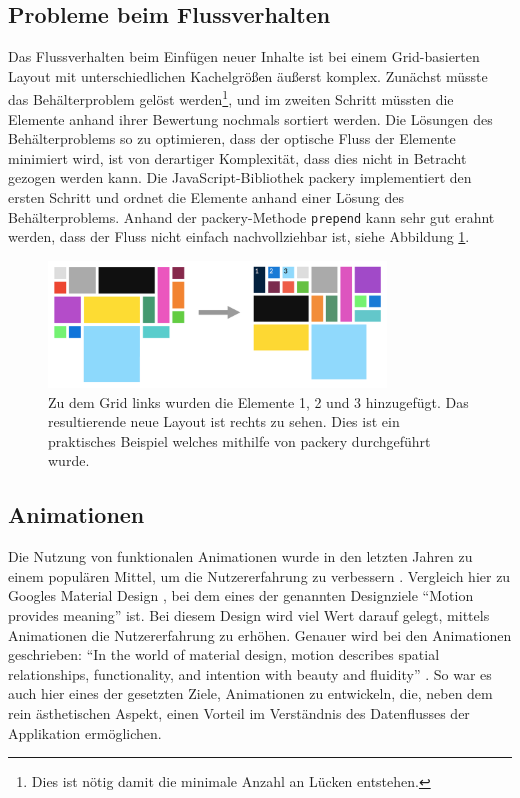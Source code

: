 \documentclass[12pt,twoside]{book}
\begin{document}
  \subsection{Probleme beim Flussverhalten}
  Das Flussverhalten beim Einfügen neuer Inhalte ist bei einem Grid-basierten Layout mit unterschiedlichen Kachelgrößen äußerst komplex. Zunächst müsste das Behälterproblem gelöst werden\footnote{Dies ist nötig damit die minimale Anzahl an Lücken entstehen.}, und im zweiten Schritt müssten die Elemente anhand ihrer Bewertung nochmals sortiert werden. Die Lösungen des Behälterproblems so zu optimieren, dass der optische Fluss der Elemente minimiert wird, ist von derartiger Komplexität, dass dies nicht in Betracht gezogen werden kann. Die JavaScript-Bibliothek packery \cite{packery} implementiert den ersten Schritt und ordnet die Elemente anhand einer Lösung des Behälterproblems. Anhand der packery-Methode \texttt{prepend} kann sehr gut erahnt werden, dass der Fluss nicht einfach nachvollziehbar ist, siehe Abbildung \ref{fig:grid_flow}.

  \begin{figure}[htbp]
    \centering
    \includegraphics[width=0.8\textwidth]{images/grid_flow.png}
    \caption{Zu dem Grid links wurden die Elemente 1, 2 und 3 hinzugefügt. Das resultierende neue Layout ist rechts zu sehen. Dies ist ein praktisches Beispiel welches mithilfe von packery durchgeführt wurde.}
    \label{fig:grid_flow}
  \end{figure}


\subsection{Animationen}

Die Nutzung von funktionalen Animationen wurde in den letzten Jahren zu einem populären Mittel, um die Nutzererfahrung zu verbessern \cite{functionalanimations}. Vergleich hier zu Googles Material Design \cite{materialdesign}, bei dem eines der genannten Designziele ``Motion provides meaning'' ist. Bei diesem Design wird viel Wert darauf gelegt, mittels Animationen die Nutzererfahrung zu erhöhen. Genauer wird bei den Animationen geschrieben: ``In the world of material design, motion describes spatial relationships, functionality, and intention with beauty and fluidity'' \cite{materialdesign}.
So war es auch hier eines der gesetzten Ziele, Animationen zu entwickeln, die, neben dem rein ästhetischen Aspekt, einen Vorteil im Verständnis des Datenflusses der Applikation ermöglichen.
\end{document}
